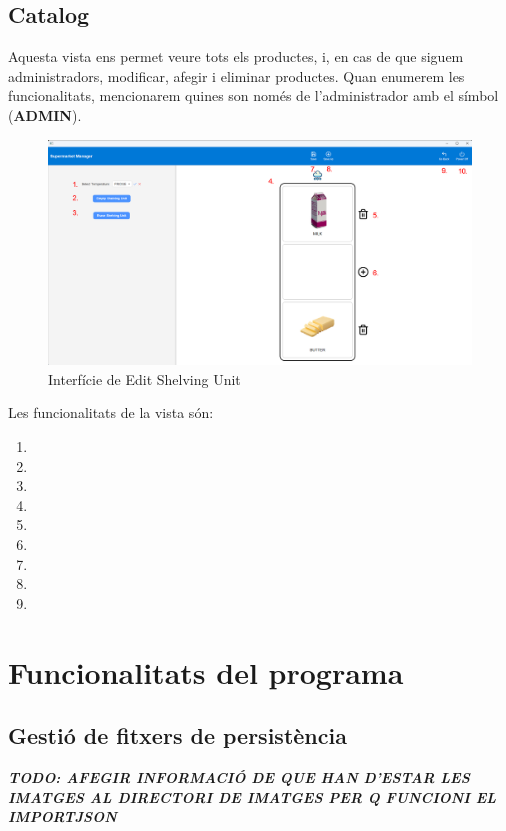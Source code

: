 \documentclass[a4paper,12pt]{article}
\begin{document}
	\newpage
	\subsection{Catalog}
	
	Aquesta vista ens permet veure tots els productes, i, en cas de que siguem administradors, modificar, afegir i eliminar productes. Quan enumerem les funcionalitats, mencionarem quines son només de l'administrador amb el símbol (\textbf{ADMIN}).
	
	\begin{figure}[H] 
		\centering
		\includegraphics[width=0.75\linewidth]{assets/editshelvingunit.png}
		\caption{Interfície de Edit Shelving Unit}
	\end{figure}
	
	\noindent Les funcionalitats de la vista són:
	
	\begin{enumerate}[itemsep=0pt, topsep=0pt]
		\item
		\item
		\item
		\item
		\item
		\item
		\item
		\item
		\item
	\end{enumerate}
	
	
	\newpage
	\section{Funcionalitats del programa}
	
	\subsection{Gestió de fitxers de persistència}
	
	\textbf{\textit{TODO: AFEGIR INFORMACIÓ DE QUE HAN D'ESTAR LES IMATGES AL DIRECTORI DE IMATGES PER Q FUNCIONI EL IMPORTJSON}}
	
\end{document}
